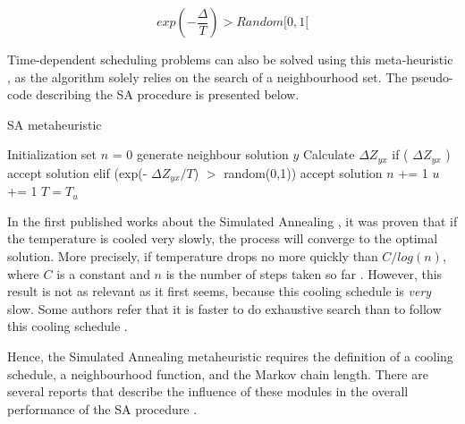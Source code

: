 \begin{equation}
\label{eq:metropolis}
  exp(-\frac{\Delta}{T}) > Random[0, 1[
\end{equation}

Time-dependent scheduling problems can also be solved using this meta-heuristic \cite{simulated_annealing_2}, as the algorithm solely relies on the search of a neighbourhood set. The pseudo-code describing the SA procedure  is presented below.

\makeatletter
\def\BState{\State\hskip-\ALG@thistlm}
\makeatother

\begin{algorithm}
\caption{SA metaheuristic}\label{eq:sa_metacode}
  \begin{algorithmic}[1]
    \State Initialization 
    \State set $n$ = 0
      generate neighbour solution $y$
    \State  Calculate $\Delta Z_{yx}$
    \State if ( $\Delta Z_{yx}$ ) accept solution 
    \State  elif (exp(- $\Delta Z_{yx}/T$) $>$ random(0,1)) accept solution
    \State  $n$ += 1
    \EndWhile
    \State  $u$ += 1
    \State $  T = T_{u}$
    \EndWhile
    \EndProcedure
  \end{algorithmic}
\end{algorithm}


In the first published works about the Simulated Annealing \cite{sa_convergence}, it was proven that if the temperature is cooled very slowly, the process will converge to the optimal solution. More precisely, if temperature drops no more quickly than $C/log(n)$, where $C$ is a constant and $n$ is the number of steps taken so far \cite{local_search_book}. However, this result is not as relevant as it first seems, because this cooling schedule is \textit{very} slow. Some authors refer that it is faster to do exhaustive search than to follow this cooling schedule \cite{local_search_book}.


Hence, the Simulated Annealing metaheuristic requires the definition of a cooling schedule, a neighbourhood function, and the Markov chain length. There are several reports that describe the influence of these modules in the overall performance of the SA procedure \cite{sa_cooling_influence}. 




